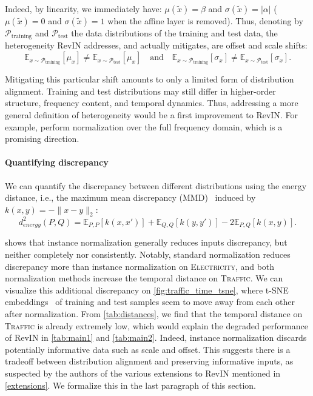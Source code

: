 Indeed, by linearity, we immediately have: $\mu(\tilde{x})=\beta$ and $\sigma(\tilde{x})=|\alpha|$ ($\mu(\tilde{x})=0$ and $\sigma(\tilde{x})=1$ when the affine layer is removed).
Thus, denoting by  $\mathcal{P}_{\textrm{training}}$ and  $\mathcal{P}_{\textrm{test}}$ the data distributions of the training and test data, the heterogeneity RevIN addresses, and actually mitigates, are offset and scale shifts:
\begin{equation}
    \mathbb{E}_{x\sim \mathcal{P}_{\textrm{training}}}[\mu_x]\neq \mathbb{E}_{x\sim\mathcal{P}_{\textrm{test}}}[\mu_x] \quad \textrm{and} \quad \mathbb{E}_{x\sim \mathcal{P}_{\textrm{training}}}[\sigma_x]\neq \mathbb{E}_{x\sim\mathcal{P}_{\textrm{test}}}[\sigma_x].
\end{equation}

Mitigating this particular shift amounts to only a limited form of distribution alignment. Training and test distributions may still differ in higher-order structure, frequency content, and temporal dynamics. Thus, addressing a more general definition of heterogeneity would be a first improvement to RevIN. For example, \citet{fan} perform normalization over the full frequency domain, which is a promising direction.

\paragraph{Quantifying discrepancy} We can quantify the discrepancy between different distributions using the energy distance, i.e., the maximum mean discrepancy (MMD)~\citep{smola2006maximum} induced by $k(x,y)=-\lVert x-y\rVert_2$:
\begin{equation}
\label{eq:energy}
d^2_{energy}(P,Q)=\mathbb{E}_{P,P}[k(x,x')]+\mathbb{E}_{Q,Q}[k(y,y')]
-2\mathbb{E}_{P,Q}[k(x,y)].
\end{equation}

 shows that instance normalization generally reduces inputs discrepancy, but neither completely nor consistently. Notably, standard normalization reduces discrepancy more than instance normalization on
\textsc{Electricity}, and both normalization methods increase the temporal distance on \textsc{Traffic}. We can visualize this additional discrepancy on \cref{fig:traffic_time_tsne}, where t-SNE embeddings~\citep{tsne} of  training and test samples seem to move away from each other after normalization. From \cref{tab:distances}, we find that the temporal distance on \textsc{Traffic} is already extremely low, which would explain the degraded performance of RevIN in \cref{tab:main1} and \cref{tab:main2}. Indeed, instance normalization discards potentially informative data such as scale and offset. This suggests there is a tradeoff between distribution alignment and preserving informative inputs, as suspected by the authors of the various extensions to RevIN mentioned in \cref{extensions}. We formalize this in the last paragraph of this section.

